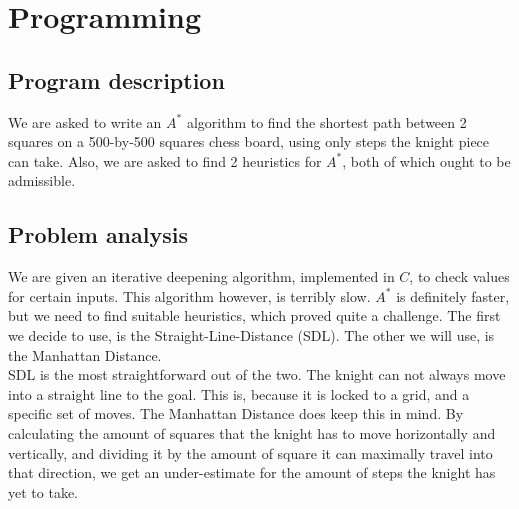 \documentclass{article}
\begin{document}

\section*{Programming} 
\subsection*{Program description}
We are asked to write an $A^*$ algorithm to find the shortest path between 2 squares on a 500-by-500 squares chess board, using only steps the knight piece can take. Also, we are asked to find 2 heuristics for $A^*$, both of which ought to be admissible.

\subsection*{Problem analysis}
We are given an iterative deepening algorithm, implemented in $C$, to check values for certain inputs. This algorithm however, is terribly slow. $A^*$ is definitely faster, but we need to find suitable heuristics, which proved quite a challenge. The first we decide to use, is the Straight-Line-Distance (SDL). The other we will use, is the Manhattan Distance.\\ SDL is the most straightforward out of the two. The knight can not always move into a straight line to the goal. This is, because it is locked to a grid, and a specific set of moves. The Manhattan Distance does keep this in mind. By calculating the amount of squares that the knight has to move horizontally and vertically, and dividing it by the amount of square it can maximally travel into that direction, we get an under-estimate for the amount of steps the knight has yet to take.
\end{document}
